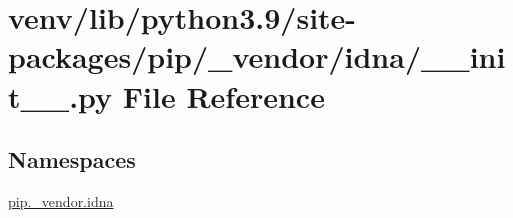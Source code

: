 \hypertarget{venv_2lib_2python3_89_2site-packages_2pip_2__vendor_2idna_2____init_____8py}{}\section{venv/lib/python3.9/site-\/packages/pip/\+\_\+vendor/idna/\+\_\+\+\_\+init\+\_\+\+\_\+.py File Reference}
\label{venv_2lib_2python3_89_2site-packages_2pip_2__vendor_2idna_2____init_____8py}
\subsection*{Namespaces}
\begin{DoxyCompactItemize}
\item 
 \hyperlink{namespacepip_1_1__vendor_1_1idna}{pip.\+\_\+vendor.\+idna}
\end{DoxyCompactItemize}
